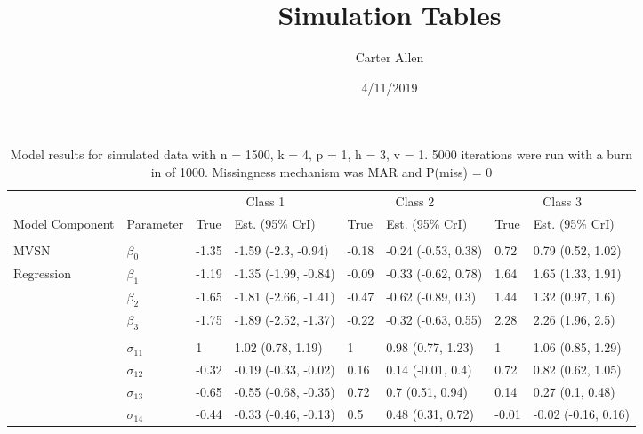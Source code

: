 \documentclass[]{article}
\title{Simulation Tables}
\author{Carter Allen}
\date{4/11/2019}
\begin{document}
\maketitle

\begin{table}[t]

\caption{\label{tab:unnamed-chunk-4}Model results for simulated data with n = 1500, k = 4, p = 1, h = 3, v = 1. 5000 iterations were run with a burn in of 1000. Missingness mechanism was MAR and P(miss) = 0}
\centering
\fontsize{8}{10}\selectfont
\begin{tabular}{llllllll}
\toprule
\multicolumn{2}{c}{ } & \multicolumn{2}{c}{Class 1} & \multicolumn{2}{c}{Class 2} & \multicolumn{2}{c}{Class 3} \\
\cmidrule(l{3pt}r{3pt}){3-4} \cmidrule(l{3pt}r{3pt}){5-6} \cmidrule(l{3pt}r{3pt}){7-8}
Model Component & Parameter & True & Est. (95\% CrI) & True & Est. (95\% CrI) & True & Est. (95\% CrI)\\
\midrule
\addlinespace[0.3em]
\multicolumn{8}{l}{\textbf{ }}\\
\hspace{1em}MVSN & $\beta_{0}$ & -1.35 & -1.59 (-2.3, -0.94) & -0.18 & -0.24 (-0.53, 0.38) & 0.72 & 0.79 (0.52, 1.02)\\
\hspace{1em}Regression & $\beta_{1}$ & -1.19 & -1.35 (-1.99, -0.84) & -0.09 & -0.33 (-0.62, 0.78) & 1.64 & 1.65 (1.33, 1.91)\\
\hspace{1em} & $\beta_{2}$ & -1.65 & -1.81 (-2.66, -1.41) & -0.47 & -0.62 (-0.89, 0.3) & 1.44 & 1.32 (0.97, 1.6)\\
\hspace{1em} & $\beta_{3}$ & -1.75 & -1.89 (-2.52, -1.37) & -0.22 & -0.32 (-0.63, 0.55) & 2.28 & 2.26 (1.96, 2.5)\\
\addlinespace[0.3em]
\multicolumn{8}{l}{\textbf{ }}\\
\hspace{1em} & $\sigma_{11}$ & 1 & 1.02 (0.78, 1.19) & 1 & 0.98 (0.77, 1.23) & 1 & 1.06 (0.85, 1.29)\\
\hspace{1em} & $\sigma_{12}$ & -0.32 & -0.19 (-0.33, -0.02) & 0.16 & 0.14 (-0.01, 0.4) & 0.72 & 0.82 (0.62, 1.05)\\
\hspace{1em} & $\sigma_{13}$ & -0.65 & -0.55 (-0.68, -0.35) & 0.72 & 0.7 (0.51, 0.94) & 0.14 & 0.27 (0.1, 0.48)\\
\hspace{1em} & $\sigma_{14}$ & -0.44 & -0.33 (-0.46, -0.13) & 0.5 & 0.48 (0.31, 0.72) & -0.01 & -0.02 (-0.16, 0.16)\\

\end{tabular}
\end{table}
\end{document}
